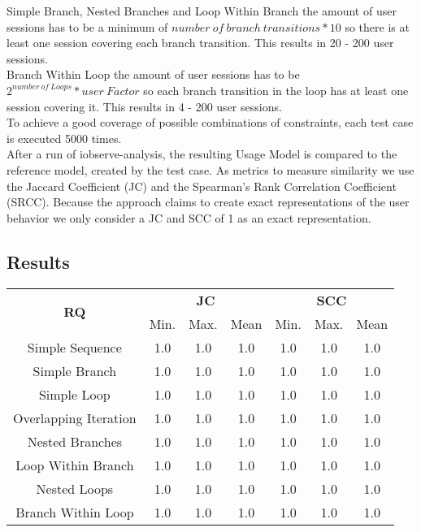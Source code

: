\documentclass[10pt,a4paper]{article}
\begin{document}
	Simple Branch, Nested Branches and Loop Within Branch the amount of user sessions has to be a minimum of $number\ of\ branch\ transitions * 10$ so there is at least one session covering each branch transition. This results in 20 - 200 user sessions.\\
	Branch Within Loop the amount of user sessions has to be $2^{number\ of\ Loops} * user\ Factor$ so each branch transition in the loop has at least one session covering it. This results in 4 - 200 user sessions.\\
	To achieve a good coverage of possible combinations of constraints, each test case is executed 5000 times.\\
	After a run of iobserve-analysis, the resulting Usage Model is compared to the reference model, created by the test case. As metrics to measure similarity we use the Jaccard Coefficient (JC) and the Spearman's Rank Correlation Coefficient (SRCC). Because the approach claims to create exact representations of the user behavior we only consider a JC and SCC of 1 as an exact representation.
	\subsection{Results}
	\begin{table}[H]
		\centering
		\begin{tabular}{|c||c|c|c||c|c|c|}
			\hline
			\multirow{2}{*}{\textbf{RQ}}
			 & \multicolumn{3}{c||}{\textbf{JC}} & \multicolumn{3}{c|}{\textbf{SCC}} \\
			 \cline{2-7}
			 & Min. & Max. & Mean & Min. & Max. & Mean \\
			\hhline{|=======|}
			Simple Sequence & 1.0 & 1.0 & 1.0 & 1.0 & 1.0 & 1.0 \\
			\hline
			Simple Branch & 1.0 & 1.0 & 1.0 & 1.0 & 1.0 & 1.0 \\
			\hline
			Simple Loop & 1.0 & 1.0 & 1.0 & 1.0 & 1.0 & 1.0 \\
			\hline
			Overlapping Iteration & 1.0 & 1.0 & 1.0 & 1.0 & 1.0 & 1.0 \\
			\hline
			Nested Branches & 1.0 & 1.0 & 1.0 & 1.0 & 1.0 & 1.0 \\
			\hline
			Loop Within Branch & 1.0 & 1.0 & 1.0 & 1.0 & 1.0 & 1.0 \\
			\hline
			Nested Loops & 1.0 & 1.0 & 1.0 & 1.0 & 1.0 & 1.0 \\
			\hline
			Branch Within Loop & 1.0 & 1.0 & 1.0 & 1.0 & 1.0 & 1.0 \\
			\hline
		\end{tabular}
	\end{table}
\end{document}
